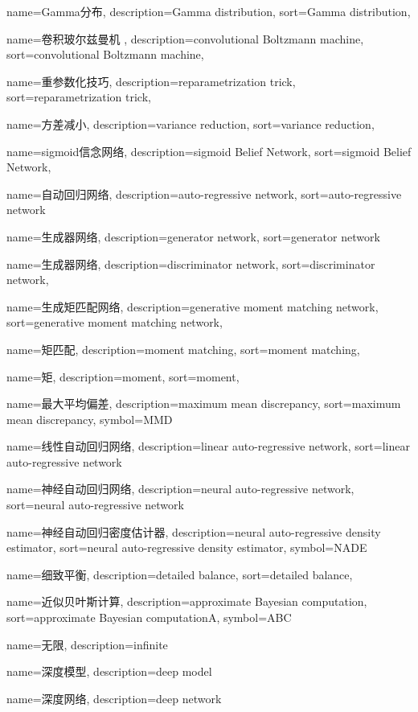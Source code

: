 {
  name=Gamma分布,
  description={Gamma distribution},
  sort={Gamma distribution},
}

{
  name=卷积玻尔兹曼机 ,
  description={convolutional Boltzmann machine},
  sort={convolutional Boltzmann machine},
}

{
  name=重参数化技巧,
  description={reparametrization trick},
  sort={reparametrization trick},
}

{
  name=方差减小,
  description={variance reduction},
  sort={variance reduction},
}

{
  name=sigmoid信念网络,
  description={sigmoid Belief Network},
  sort={sigmoid Belief Network},
}

{
  name=自动回归网络,
  description={auto-regressive network},
  sort={auto-regressive network}
}

{
  name=生成器网络,
  description={generator network},
  sort={generator network}
}

{
  name=生成器网络,
  description={discriminator network},
  sort={discriminator network},
}

{
  name=生成矩匹配网络,
  description={generative moment matching network},
  sort={generative moment matching network},
}

{
  name=矩匹配,
  description={moment matching},
  sort={moment matching},
}

{
  name=矩,
  description={moment},
  sort={moment},
}

{
  name=最大平均偏差,
  description={maximum mean discrepancy},
  sort={maximum mean discrepancy},
  symbol={MMD}
}

{
  name=线性自动回归网络,
  description={linear auto-regressive network},
  sort={linear auto-regressive network}
}

{
  name=神经自动回归网络,
  description={neural auto-regressive network},
  sort={neural auto-regressive network}
}

{
  name=神经自动回归密度估计器,
  description={neural auto-regressive density estimator},
  sort={neural auto-regressive density estimator},
  symbol={NADE}
}

{
  name=细致平衡,
  description={detailed balance},
  sort={detailed balance},
}

{
  name=近似贝叶斯计算,
  description={approximate Bayesian computation},
  sort={approximate Bayesian computationA},
  symbol={ABC}
}

{
  name=无限,
  description={infinite}
}

{
  name=深度模型,
  description={deep model}
}

{
  name=深度网络,
  description={deep network}
}
